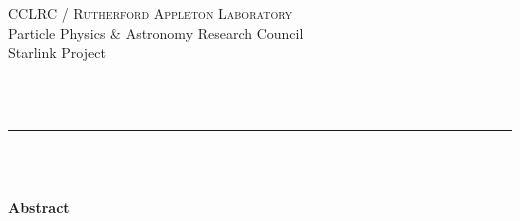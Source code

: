 \thispagestyle{empty}

\begin{latexonly}
   CCLRC / \textsc{Rutherford Appleton Laboratory} \hfill \textbf{\stardocname}\\
   {\large Particle Physics \& Astronomy Research Council}\\
   {\large Starlink Project\\}
   {\large \stardoccategory\ \stardocnumber}
   \begin{flushright}
   \stardocauthors\\
   \stardocdate
   \end{flushright}
   \vspace{-4mm}
   \rule{\textwidth}{0.5mm}
   \vspace{5mm}
   \begin{center}
   {\Huge\textbf{\stardoctitle \\ [2.5ex]}}
   {\LARGE\textbf{\stardocversion \\ [4ex]}}
   {\Huge\textbf{\stardocmanual}}
   \end{center}
   \vspace{5mm}


   \vspace{10mm}
   \begin{center}
      {\Large\textbf{Abstract}}
   \end{center}
\end{latexonly}

